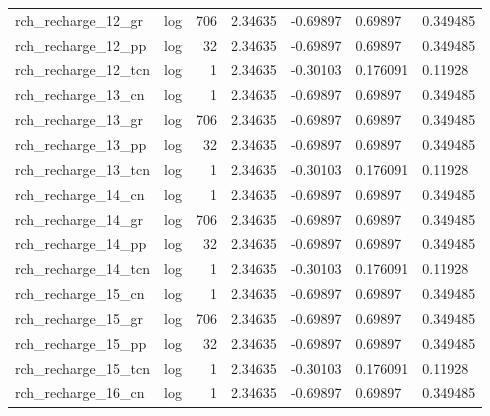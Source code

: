 \documentclass{article}
\begin{document}
\begin{center}
\begin{landscape}
\begin{longtable}{llrllll}
 rch\_recharge\_12\_gr &       log &    706 &        2.34635 &            -0.69897 &            0.69897 &           0.349485 \\
 rch\_recharge\_12\_pp &       log &     32 &        2.34635 &            -0.69897 &            0.69897 &           0.349485 \\
rch\_recharge\_12\_tcn &       log &      1 &        2.34635 &            -0.30103 &           0.176091 &            0.11928 \\
 rch\_recharge\_13\_cn &       log &      1 &        2.34635 &            -0.69897 &            0.69897 &           0.349485 \\
 rch\_recharge\_13\_gr &       log &    706 &        2.34635 &            -0.69897 &            0.69897 &           0.349485 \\
 rch\_recharge\_13\_pp &       log &     32 &        2.34635 &            -0.69897 &            0.69897 &           0.349485 \\
rch\_recharge\_13\_tcn &       log &      1 &        2.34635 &            -0.30103 &           0.176091 &            0.11928 \\
 rch\_recharge\_14\_cn &       log &      1 &        2.34635 &            -0.69897 &            0.69897 &           0.349485 \\
 rch\_recharge\_14\_gr &       log &    706 &        2.34635 &            -0.69897 &            0.69897 &           0.349485 \\
 rch\_recharge\_14\_pp &       log &     32 &        2.34635 &            -0.69897 &            0.69897 &           0.349485 \\
rch\_recharge\_14\_tcn &       log &      1 &        2.34635 &            -0.30103 &           0.176091 &            0.11928 \\
 rch\_recharge\_15\_cn &       log &      1 &        2.34635 &            -0.69897 &            0.69897 &           0.349485 \\
 rch\_recharge\_15\_gr &       log &    706 &        2.34635 &            -0.69897 &            0.69897 &           0.349485 \\
 rch\_recharge\_15\_pp &       log &     32 &        2.34635 &            -0.69897 &            0.69897 &           0.349485 \\
rch\_recharge\_15\_tcn &       log &      1 &        2.34635 &            -0.30103 &           0.176091 &            0.11928 \\
 rch\_recharge\_16\_cn &       log &      1 &        2.34635 &            -0.69897 &            0.69897 &           0.349485 \\

\end{longtable}
\end{landscape}
\end{center}
\end{document}
